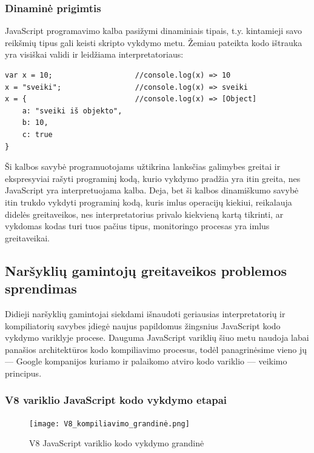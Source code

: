 \documentclass{VUMIFPSkursinis}
\begin{document}
\subsubsection{Dinaminė prigimtis}

JavaScript programavimo kalba pasižymi dinaminiais tipais, t.y. kintamieji savo reikšmių tipus gali keisti skripto vykdymo metu. Žemiau pateikta kodo ištrauka yra visiškai validi ir leidžiama interpretatoriaus:

\begin{center}
\begin{small}
\begin{verbatim}
var x = 10;                   //console.log(x) => 10
x = "sveiki";                 //console.log(x) => sveiki
x = {                         //console.log(x) => [Object]
    a: "sveiki iš objekto",
    b: 10,
    c: true
}
\end{verbatim}
\end{small}
\end{center}

Ši kalbos savybė programuotojams užtikrina lanksčias galimybes greitai ir ekspresyviai rašyti programinį kodą, kurio vykdymo pradžia yra itin greita, nes JavaScript yra interpretuojama kalba. Deja, bet ši kalbos dinamiškumo savybė itin trukdo vykdyti programinį kodą, kuris imlus operacijų kiekiui, reikalauja didelės greitaveikos, nes interpretatorius privalo kiekvieną kartą tikrinti, ar vykdomas kodas turi tuos pačius tipus, monitoringo procesas yra imlus greitaveikai. \cite{Cla17}

\subsection{Naršyklių gamintojų greitaveikos problemos sprendimas}


Didieji naršyklių gamintojai siekdami išnaudoti geriausias interpretatorių ir kompiliatorių savybes įdiegė naujus papildomus žingsnius JavaScript kodo vykdymo variklyje procese. Dauguma JavaScript variklių šiuo metu naudoja labai panašios architektūros kodo kompiliavimo procesus, todėl panagrinėsime vieno jų — Google kompanijos kuriamo ir palaikomo atviro kodo variklio — veikimo principus.

\subsubsection{V8 variklio JavaScript kodo vykdymo etapai}
\begin{figure}[h!]
  \begin{center}
  \texttt{[image: V8\_kompiliavimo\_grandinė.png]}
  \end{center}
  \caption{V8 JavaScript variklio kodo vykdymo grandinė \cite{Kad19}}
  \label{fig:v8_pipeline}
\end{figure}
\end{document}
